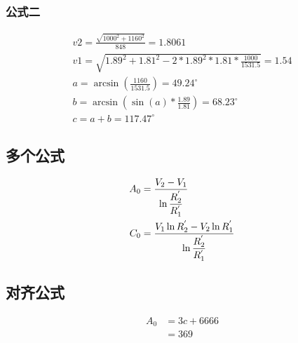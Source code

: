 \documentclass[12pt,a4paper]{article}%
\begin{document}
    \subsubsection{公式二}
    \begin{eqnarray}
        v2=\frac{\sqrt{1000^2+1160^2}}{848}=1.8061 
       \\ v1=\sqrt{1.89^2+1.81^2-2*1.89^2*1.81*\frac{1000}{1531.5}}=1.54
        \\a=\arcsin(\frac{1160}{1531.5})=49.24^{\circ}
        \\b=\arcsin(\sin(a)*\frac{1.89}{1.81})=68.23^{\circ}
        \\c=a+b=117.47^{\circ}
    \end{eqnarray}

\subsection{多个公式}

\begin{equation}
	\centering
	\begin{split}%
		A_0&=\frac{V_2-V_1}{\ln \dfrac{R_{2}^{'}}{R_{1}^{'}}}\\
		C_0&=\frac{V_1\ln R_{2}^{'}-V_2\ln R_{1}^{'}}{\ln \dfrac{R_{2}^{'}}{R_{1}^{'}}}
	\end{split}
\end{equation}

\subsection{对齐公式}

\begin{align}%
    A_0&=3c+6666\\%
    &=369
\end{align}
\end{document}
